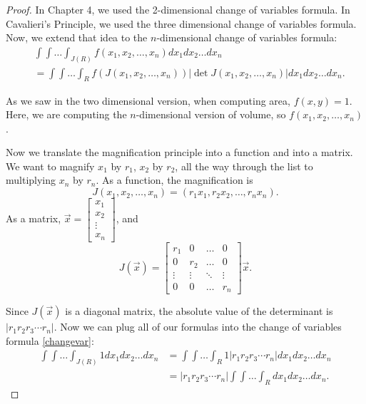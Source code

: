 \documentclass[newpage,hints,handout]{ximera}
\begin{document}
\begin{proof}
In Chapter 4, we used the 2-dimensional change of variables formula. In Cavalieri's Principle, we used the three dimensional change of variables formula. Now, we extend that idea to the $n$-dimensional change of variables formula:
\begin{equation}\label{changevar}
\begin{split}
 &\int\int\dots\int_{J(R)} f(x_1,x_2,\dots,x_n)dx_1 dx_2\dots dx_n\\
 &= \int\int\dots\int_{R} f(J(x_1,x_2,\dots,x_n))|\det J(x_1,x_2,\dots,x_n)|dx_1 dx_2\dots dx_n.
\end{split}\end{equation}

As we saw in the two dimensional version, when computing area, $f(x,y)=1$. Here, we are computing the $n$-dimensional version of volume, so $f(x_1,x_2,\dots,x_n)$. 

Now we translate the magnification principle into a function and into a matrix. We want to magnify $x_1$ by $r_1$, $x_2$ by $r_2$, all the way through the list to multiplying $x_n$ by $r_n$. As a function, the magnification is \[J(x_1,x_2,\dots,x_n)=(r_1 x_1,r_2 x_2,\dots, r_n x_n).\] As a matrix, $\vec x=
\left[\begin{smallmatrix}
 x_1\\x_2\\\vdots\\x_n
\end{smallmatrix}\right]$, and \[
J(\vec x)=
\begin{bmatrix}
r_{1} & 0   & \dots & 0\\
0     & r_2 & \dots & 0\\
\vdots &\vdots &\ddots & \vdots \\
0     & 0   & \dots & r_{n}%
\end{bmatrix}\vec x.
\]

Since $J(\vec x)$ is a diagonal matrix, the absolute value of the determinant is $|r_1 r_2 r_3\cdots r_n|$. Now we can plug all of our formulas into the change of variables formula \eqref{changevar}:
\begin{equation}
\begin{split}
 \int\int\dots\int_{J(R)}1dx_1 dx_2\dots dx_n
 &= \int\int\dots\int_{R}1|r_1 r_2 r_3\cdots r_n|dx_1 dx_2\dots dx_n\\
 &=|r_1 r_2 r_3\cdots r_n|\int\int\dots\int_{R}dx_1 dx_2\dots dx_n.
\end{split}\end{equation}
\end{proof}
\end{document}

